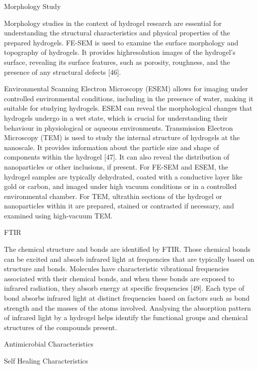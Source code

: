 \documentclass[../../main-notes.tex]{subfiles}
\begin{document}
Morphology Study

Morphology studies in the context of hydrogel research are essential for understanding the structural characteristics and physical properties of the prepared hydrogels. 
FE-SEM is used to examine the surface morphology and topography of hydrogels. 
It provides highresolution images of the hydrogel’s surface, revealing its surface features, such as porosity, roughness, and the presence of any structural defects [46]. 

Environmental Scanning Electron Microscopy (ESEM) allows for imaging under controlled environmental conditions, including in the presence of water, making it suitable for studying hydrogels. 
ESEM can reveal the morphological changes that hydrogels undergo in a wet state, which is crucial for understanding their behaviour in physiological or aqueous environments. 
Transmission Electron Microscopy (TEM) is used to study the internal structure of hydrogels at the nanoscale.
It provides information about the particle size and shape of components within the hydrogel [47]. 
It can also reveal the distribution of nanoparticles or other inclusions, if present. For FE-SEM and ESEM, the hydrogel samples are typically dehydrated, coated with a conductive layer like gold or carbon, and imaged under high vacuum conditions or in a controlled environmental chamber. 
For TEM, ultrathin sections of the hydrogel or nanoparticles within it are prepared, stained or contrasted if necessary, and examined using high-vacuum TEM.




FTIR


The chemical structure and bonds are identified by FTIR. 
Those chemical bonds can be excited and absorb infrared light at frequencies that are typically based on structure and bonds.
Molecules have characteristic vibrational frequencies associated with their chemical bonds, and when these bonds are exposed to infrared radiation, they absorb energy at specific frequencies [49]. 
Each type of bond absorbs infrared light at distinct frequencies based on factors such as bond strength and the masses of the atoms involved. 
Analysing the absorption pattern of infrared light by a hydrogel helps identify the functional groups and chemical structures of the compounds present.







Antimicrobial Characteristics 

Self Healing Characteristics 
\end{document}
